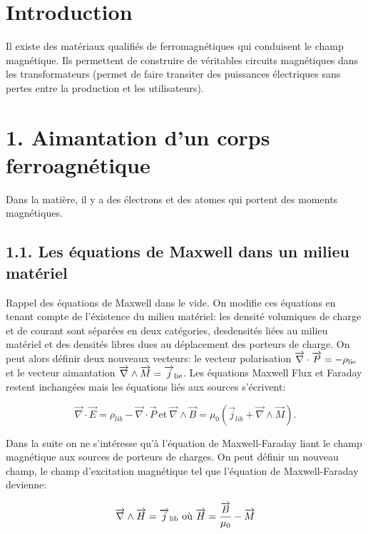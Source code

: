\documentclass[french, a4paper, 10pt, twocolumn, landscape]{article}
\begin{document}
\hrulefill

\section*{Introduction}
Il existe des matériaux qualifiés de ferromagnétiques qui conduisent le champ magnétique. Ils permettent de construire de véritables circuits magnétiques dans les transformateurs (permet de faire transiter des puissances électriques sans pertes entre la production et les utilisateurs). 

\section*{1. Aimantation d'un corps ferroagnétique}
Dans la matière, il y a des électrons et des atomes qui portent des moments magnétiques. 


\subsection*{1.1. Les équations de Maxwell dans un milieu matériel}

Rappel des équations de Maxwell dans le vide.
On modifie ces équations en tenant compte de l'éxistence du milieu matériel: les densité volumiques de charge et de courant sont séparées en deux catégories, desdensités liées au milieu matériel et des densités libres  dues au déplacement des porteurs de charge. On peut alors définir deux nouveaux vecteurs: le vecteur polarisation $\vec{\nabla}\cdot \vec{P}=-\rho_{\rm lie}$ et le vecteur aimantation $\vec{\nabla}\wedge \vec{M}=\vec{j}_{\rm lie}$. Les équations Maxwell Flux et Faraday restent inchangées mais les équations liés aux sources s'écrivent:

\begin{equation}
    \vec{\nabla}\cdot \vec{E}=\rho_{lib}-\vec{\nabla}\cdot \vec{P}~\text{et}~\vec{\nabla}\wedge \vec{B}=\mu_0\left(\vec{j}_{lib}+\vec{\nabla}\wedge\vec{M}\right).
\end{equation}

Dans la suite on ne s'intéresse qu'à l'équation de Maxwell-Faraday liant le champ magnétique aux sources de porteurs de charges. On peut définir un nouveau champ, le champ d'excitation magnétique tel que l'équation de Maxwell-Faraday devienne: 

\begin{equation}
    \vec{\nabla}\wedge \vec{H}=\vec{j}_{\rm lib}~\text{où}~\vec{H}=\dfrac{\vec{B}}{\mu_0}-\vec{M}
\end{equation}
\end{document}
